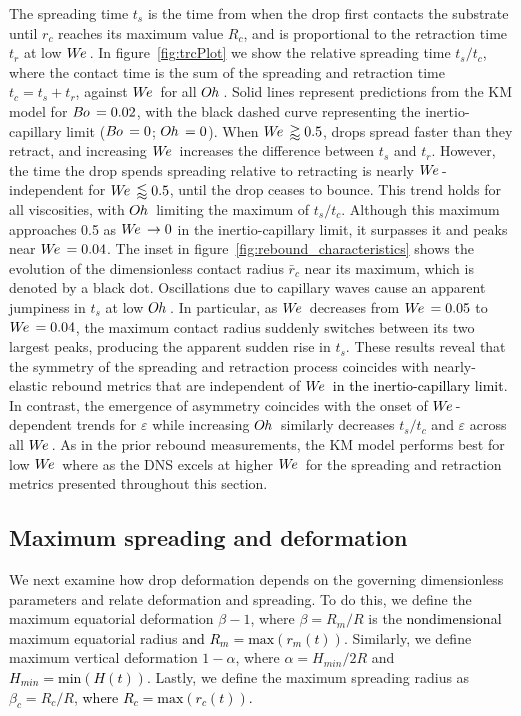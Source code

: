 \documentclass{jfm}
\newcommand{\edit}[1]{\textcolor{black}{#1}}
\newcommand{\We}{W\kern-0.15em e\,}
\newcommand{\Bo}{B\kern-0.05em o\,}
\newcommand{\Oh}{O\kern-0.05em h\,}
\begin{document}
The spreading time $t_s$ is the time from when the drop first contacts the substrate until $r_c$ reaches its maximum value $R_c$, and is proportional to the retraction time $t_r$ at low $\We$. In figure~\ref{fig:trcPlot} we show the relative spreading time $t_{s} / t_{c}$, where the contact time is the sum of the spreading and retraction time $t_{c} = t_{s} + t_{r}$, against $\We$ for all $\Oh$. Solid lines represent predictions from the KM model for $\Bo=0.02$, with the black dashed curve representing the inertio-capillary limit ($\Bo=0$; $\Oh=0$). When $\We \gtrapprox 0.5$, drops spread faster than they retract, and increasing $\We$ increases the difference between $t_s$ and $t_r$. However, the time the drop spends spreading relative to retracting is nearly $\We$-independent for $\We \lessapprox 0.5$, until the drop ceases to bounce. This trend holds for all viscosities, with $\Oh$ limiting the maximum of $t_{s} / t_{c}$. Although this maximum approaches 0.5 as $\We \rightarrow 0$ in the inertio-capillary limit, it surpasses it and peaks near $\We = 0.04$. The inset in figure~\ref{fig:rebound_characteristics} shows the evolution of the dimensionless contact radius $\bar{r}_c$ near its maximum, which is denoted by a black dot. Oscillations due to capillary waves cause an apparent jumpiness in $t_s$ at low $\Oh$. In particular, as $\We$ decreases from $\We = 0.05$ to $\We= 0.04$, the maximum contact radius suddenly switches between its two largest peaks, producing the apparent sudden rise in $t_s$. These results reveal that the symmetry of the spreading and retraction process coincides with nearly-elastic rebound metrics that are independent of $\We$ \edit{in the inertio-capillary limit}. In contrast, the emergence of asymmetry coincides with the onset of $\We$-dependent trends for $\varepsilon$ while increasing $\Oh$ similarly decreases $t_{s}/t_{c}$ and $\varepsilon$ across all $\We$. As in the prior rebound measurements, the KM model performs best for low $\We$ where as the DNS excels at higher $\We$ for the spreading and retraction metrics presented throughout this section.

\subsection{Maximum spreading and deformation} \label{subsec:DropShape}

We next examine how drop deformation depends on the governing dimensionless parameters and relate deformation and spreading. To do this, we define the maximum equatorial deformation $\beta - 1$, where $\beta = R_{m} / R$ is the \edit{nondimensional} maximum equatorial radius \edit{and $R_{m}=\textrm{max}(r_{m}(t))$}. Similarly, we define maximum vertical deformation $1 - \alpha$, where $\alpha = H_{min} / 2R$ and \edit{$H_{min} = \textrm{min}(H(t))$}. Lastly, we define the maximum spreading radius as $\beta_{c} = R_{c} / R$, \edit{where $R_{c} = \textrm{max}(r_{c}(t))$.}
\end{document}
